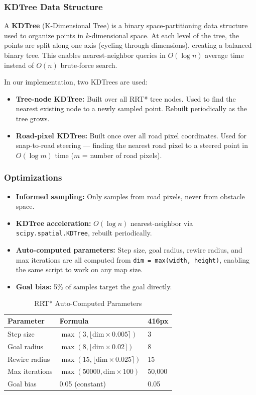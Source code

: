 \documentclass[conference,twocolumn]{IEEEtran}
\begin{document}
\subsubsection{KDTree Data Structure}

A \textbf{KDTree} (K-Dimensional Tree) is a binary space-partitioning data structure used to organize points in $k$-dimensional space. At each level of the tree, the points are split along one axis (cycling through dimensions), creating a balanced binary tree. This enables nearest-neighbor queries in $O(\log n)$ average time instead of $O(n)$ brute-force search.

In our implementation, two KDTrees are used:
\begin{itemize}
    \item \textbf{Tree-node KDTree:} Built over all RRT* tree nodes. Used to find the nearest existing node to a newly sampled point. Rebuilt periodically as the tree grows.
    \item \textbf{Road-pixel KDTree:} Built once over all road pixel coordinates. Used for snap-to-road steering — finding the nearest road pixel to a steered point in $O(\log m)$ time ($m$ = number of road pixels).
\end{itemize}

\subsubsection{Optimizations}

\begin{itemize}
    \item \textbf{Informed sampling:} Only samples from road pixels, never from obstacle space.
    \item \textbf{KDTree acceleration:} $O(\log n)$ nearest-neighbor via \texttt{scipy.spatial.KDTree}, rebuilt periodically.
    \item \textbf{Auto-computed parameters:} Step size, goal radius, rewire radius, and max iterations are all computed from \texttt{dim = max(width, height)}, enabling the same script to work on any map size.
    \item \textbf{Goal bias:} 5\% of samples target the goal directly.
\end{itemize}

\begin{table}[H]
\centering
\caption{RRT* Auto-Computed Parameters}
\label{tab:rrt_params}
\begin{tabular}{@{}lll@{}}
\toprule
\textbf{Parameter} & \textbf{Formula} & \textbf{416px} \\
\midrule
Step size & $\max(3, \lfloor \text{dim} \times 0.005 \rceil)$ & 3 \\
Goal radius & $\max(8, \lfloor \text{dim} \times 0.02 \rceil)$ & 8 \\
Rewire radius & $\max(15, \lfloor \text{dim} \times 0.025 \rceil)$ & 15 \\
Max iterations & $\max(50000, \text{dim} \times 100)$ & 50,000 \\
Goal bias & 0.05 (constant) & 0.05 \\
\bottomrule
\end{tabular}
\end{table}
\end{document}
